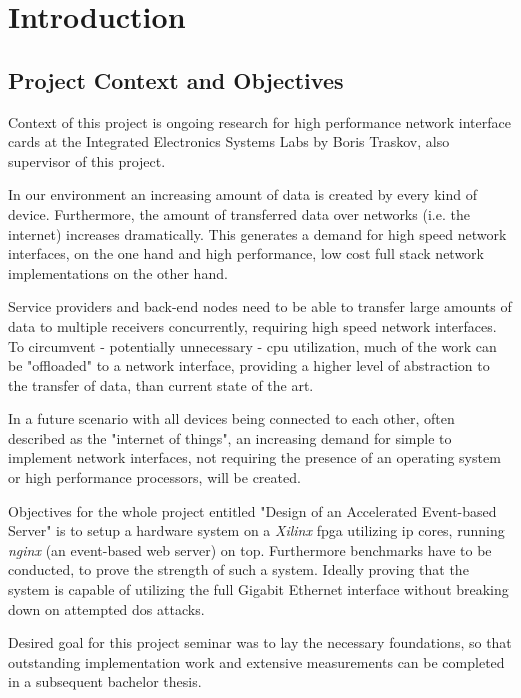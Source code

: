 \chapter{Introduction}

\section{Project Context and Objectives}

Context of this project is ongoing research for high performance network interface cards at the Integrated Electronics Systems Labs by Boris Traskov, also supervisor of this project.

In our environment an increasing amount of data is created by every kind of device. Furthermore, the amount of transferred data over networks (i.e. the internet) increases dramatically. This generates a demand for high speed network interfaces, on the one hand and high performance, low cost full stack network implementations on the other hand. 

Service providers and back-end nodes need to be able to transfer large amounts of data to multiple receivers concurrently, requiring high speed network interfaces. To circumvent - potentially unnecessary - \gls{cpu} utilization, much of the work can be "offloaded" to a network interface, providing a higher level of abstraction to the transfer of data, than current state of the art.

In a future scenario with all devices being connected to each other, often described as the "internet of things", an increasing demand for simple to implement network interfaces, not requiring the presence of an operating system or high performance processors, will be created.


Objectives for the whole project entitled "Design of an Accelerated Event-based Server" is to setup a hardware system on a \textit{Xilinx} \gls{fpga} utilizing \gls{ip} cores, running \textit{nginx} (an event-based web server) on top. Furthermore benchmarks have to be conducted, to prove the strength of such a system. Ideally proving that the system is capable of utilizing the full Gigabit Ethernet interface without breaking down on attempted \gls{dos} attacks.

Desired goal for this project seminar was to lay the necessary foundations, so that outstanding implementation work and extensive measurements can be completed in a subsequent bachelor thesis.

